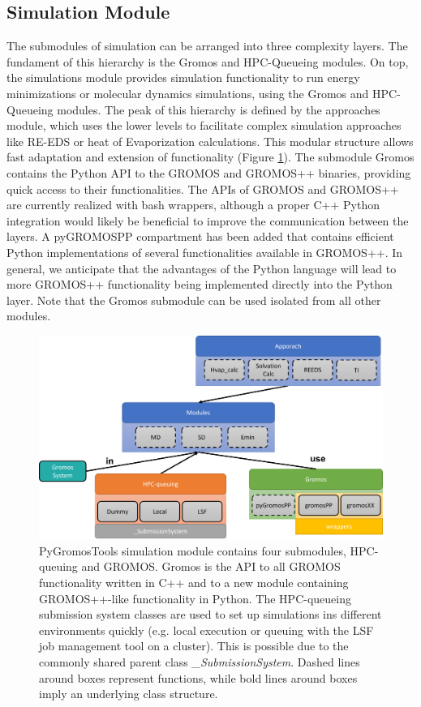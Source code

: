 \subsection{Simulation Module}
The submodules of simulation can be arranged into three complexity layers. The fundament of this hierarchy is the Gromos and HPC-Queueing modules. On top, the simulations module provides simulation functionality to run energy minimizations or molecular dynamics simulations, using the Gromos and HPC-Queueing modules. The peak of this hierarchy is defined by the approaches module, which uses the lower levels to facilitate complex simulation approaches like RE-EDS or heat of Evaporization calculations.  This modular structure allows fast adaptation and extension of functionality (Figure \ref{fig: SimulationModule}).
%
The submodule  Gromos contains the Python API to the GROMOS\cite{Schmid2012} and GROMOS++\cite{Eichenberger2011} binaries, providing quick access to their functionalities. The APIs of GROMOS and GROMOS++ are currently realized with bash wrappers, although a proper C++ Python integration would likely be beneficial to improve the communication between the layers. A pyGROMOSPP compartment has been added that contains efficient Python implementations of several functionalities available in GROMOS++. In general, we anticipate that the advantages of the Python language will lead to more GROMOS++ functionality being implemented directly into the Python layer. Note that the Gromos submodule can be used isolated from all other modules.

\begin{figure}[h]
    \centering
    \includegraphics[width=\textwidth]{fig/implementation/Simulation.png}
    \caption{PyGromosTools simulation module contains four submodules, HPC-queuing and GROMOS. Gromos is the API to all GROMOS functionality written in C++ and to a new module containing GROMOS++-like functionality in Python. The HPC-queueing submission system classes are used to set up simulations ins different environments quickly  (e.g. local execution or queuing with the LSF job management tool on a cluster). This is possible due to the commonly shared parent class \textit{\_SubmissionSystem}. Dashed lines around boxes represent functions, while bold lines around boxes imply an underlying class structure.}
    \label{fig: SimulationModule}
\end{figure}

